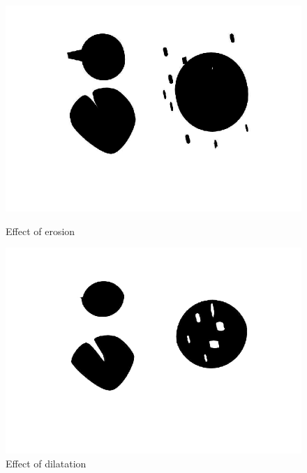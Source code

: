 \begin{figure}[H]
	\centering
	\begin{minipage}[t]{0.4\textwidth}
		\includegraphics[width=\textwidth]{images/images1eroded.png}
		\caption{Effect of erosion}
		\label{fig:bloodBWeroded}
	\end{minipage}
	\begin{minipage}[t]{0.4\textwidth}
		\includegraphics[width=\textwidth]{images/images1dilated.png}
		\caption{Effect of dilatation}
		\label{fig:images1dilated}
	\end{minipage}
\end{figure}

